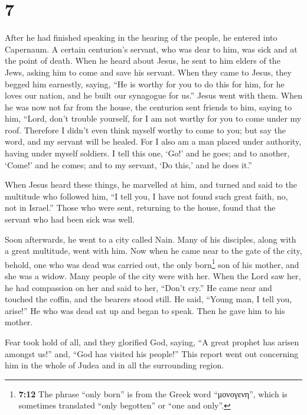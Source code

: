 \hypertarget{section-6}{%
\section{7}\label{section-6}}

 After he had finished speaking in the hearing of the
people, he entered into Capernaum.  A certain centurion's
servant, who was dear to him, was sick and at the point of death.
 When he heard about Jesus, he sent to him elders of the
Jews, asking him to come and save his servant.  When they
came to Jesus, they begged him earnestly, saying, ``He is worthy for you
to do this for him,  for he loves our nation, and he built
our synagogue for us.''  Jesus went with them. When he was
now not far from the house, the centurion sent friends to him, saying to
him, ``Lord, don't trouble yourself, for I am not worthy for you to come
under my roof.  Therefore I didn't even think myself
worthy to come to you; but say the word, and my servant will be healed.
 For I also am a man placed under authority, having under
myself soldiers. I tell this one, `Go!' and he goes; and to another,
`Come!' and he comes; and to my servant, `Do this,' and he does it.''

 When Jesus heard these things, he marvelled at him, and
turned and said to the multitude who followed him, ``I tell you, I have
not found such great faith, no, not in Israel.''  Those
who were sent, returning to the house, found that the servant who had
been sick was well.

 Soon afterwards, he went to a city called Nain. Many of
his disciples, along with a great multitude, went with him.
 Now when he came near to the gate of the city, behold,
one who was dead was carried out, the only born\footnote{\textbf{7:12}
  The phrase ``only born'' is from the Greek word ``μονογενη'', which is
  sometimes translated ``only begotten'' or ``one and only''.} son of
his mother, and she was a widow. Many people of the city were with her.
 When the Lord saw her, he had compassion on her and said
to her, ``Don't cry.''  He came near and touched the
coffin, and the bearers stood still. He said, ``Young man, I tell you,
arise!''  He who was dead sat up and began to speak. Then
he gave him to his mother.

 Fear took hold of all, and they glorified God, saying,
``A great prophet has arisen amongst us!'' and, ``God has visited his
people!''  This report went out concerning him in the
whole of Judea and in all the surrounding region.

